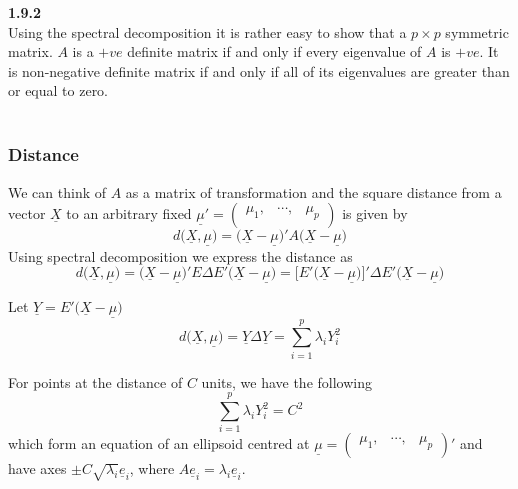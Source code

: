 \documentclass[11pt,a4paper]{article}
\theoremstyle{definition}
\begin{document}
\textbf{1.9.2}\\
Using the spectral decomposition it is rather easy to show that a $p \times p$ symmetric matrix. $A$ is a $+ve$ definite matrix if and only if every eigenvalue of $A$ is $+ve$. It is non-negative definite matrix if and only if all of its eigenvalues are greater than or equal to zero.\\\\

\subsubsection{Distance}
We can think of $A$ as a matrix of transformation and the square distance from a vector $\underline{X}$ to an arbitrary fixed $\underline{\mu}' = \begin{pmatrix}
\mu_1, & \cdots, & \mu_p\\
\end{pmatrix}$ is given by $$d\big(\underline{X},\underline{\mu}\big) = \big(\underline{X}-\underline{\mu}\big)' A\big(\underline{X}-\underline{\mu}\big)$$ Using spectral decomposition we express the distance as $$d\big(\underline{X},\underline{\mu}\big) =\big(\underline{X}-\underline{\mu}\big)'E\Delta E'\big(\underline{X}-\underline{\mu}\big)=\big[E'\big(\underline{X}-\underline{\mu}\big)\big]'\Delta E'\big(\underline{X}-\underline{\mu}\big)$$

Let $\underline{Y} = E'\big(\underline{X}-\underline{\mu}\big)$ $$d\big(\underline{X},\underline{\mu}\big) = \underline{Y}\Delta \underline{Y}= \sum^p_{i=1}\lambda_iY_i^2$$

For points at the distance of $C$ units, we have the following $$\sum^p_{i=1}\lambda_iY^2_i = C^2$$
which form an equation of an ellipsoid centred at $\underline{\mu} = \begin{pmatrix}
\mu_1, & \cdots, & \mu_p\\
\end{pmatrix}'$ and have axes $\pm C\sqrt{\lambda_i}\underline{e}_i$, where $A\underline{e}_i = \lambda_i \underline{e}_i$.



\begin{figure}[H]
\centering
{}
\end{figure}
\end{document}
